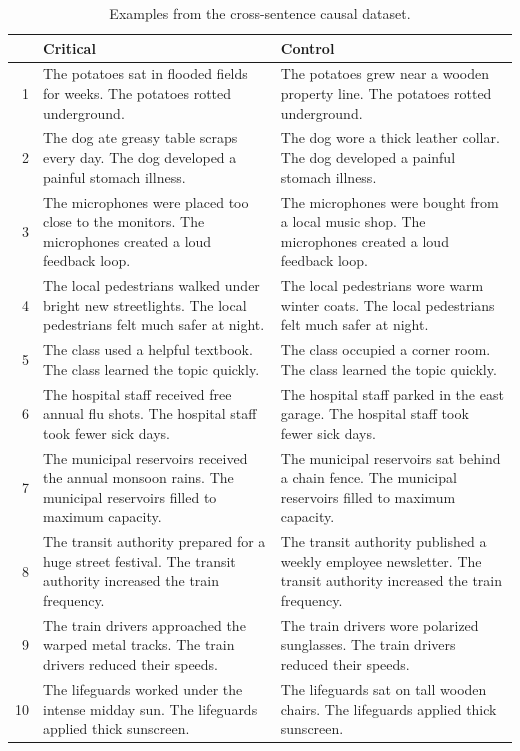 \begin{table}[t]
\centering
\footnotesize
\setlength{\tabcolsep}{4pt}
\renewcommand{\arraystretch}{1.08}
\caption{Examples from the cross-sentence causal dataset.}
\label{tab:cross-sentence-examples}
\begin{tabular}{@{}r >{\raggedright\arraybackslash}p{} >{\raggedright\arraybackslash}p{}@{}}
\toprule
& Critical & Control \\
\midrule
1 & The potatoes sat in flooded fields for weeks. The potatoes rotted underground. & The potatoes grew near a wooden property line. The potatoes rotted underground. \\
2 & The dog ate greasy table scraps every day. The dog developed a painful stomach illness. & The dog wore a thick leather collar. The dog developed a painful stomach illness. \\
3 & The microphones were placed too close to the monitors. The microphones created a loud feedback loop. & The microphones were bought from a local music shop. The microphones created a loud feedback loop. \\
4 & The local pedestrians walked under bright new streetlights. The local pedestrians felt much safer at night. & The local pedestrians wore warm winter coats. The local pedestrians felt much safer at night. \\
5 & The class used a helpful textbook. The class learned the topic quickly. & The class occupied a corner room. The class learned the topic quickly. \\
6 & The hospital staff received free annual flu shots. The hospital staff took fewer sick days. & The hospital staff parked in the east garage. The hospital staff took fewer sick days. \\
7 & The municipal reservoirs received the annual monsoon rains. The municipal reservoirs filled to maximum capacity. & The municipal reservoirs sat behind a chain fence. The municipal reservoirs filled to maximum capacity. \\
8 & The transit authority prepared for a huge street festival. The transit authority increased the train frequency. & The transit authority published a weekly employee newsletter. The transit authority increased the train frequency. \\
9 & The train drivers approached the warped metal tracks. The train drivers reduced their speeds. & The train drivers wore polarized sunglasses. The train drivers reduced their speeds. \\
10 & The lifeguards worked under the intense midday sun. The lifeguards applied thick sunscreen. & The lifeguards sat on tall wooden chairs. The lifeguards applied thick sunscreen. \\
\bottomrule
\end{tabular}
\end{table}

